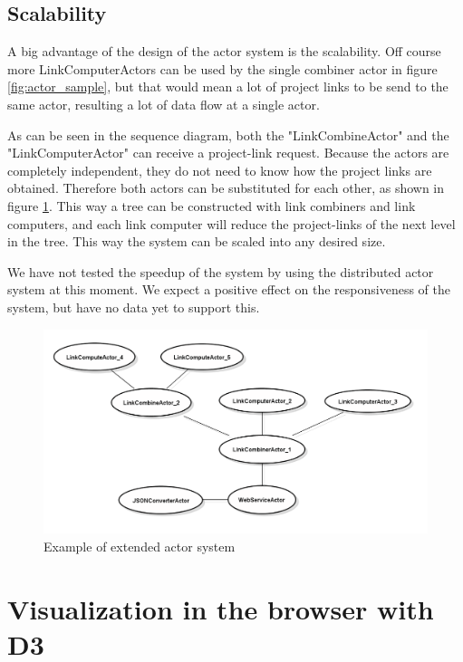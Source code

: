\documentclass[10pt,a4paper]{article}
\begin{document}

\subsection{Scalability}

A big advantage of the design of the actor system is the scalability. Off course more LinkComputerActors can be used by the single combiner actor in figure \ref{fig:actor_sample}, but that would mean a lot of project links to be send to the same actor, resulting a lot of data flow at a single actor. 

As can be seen in the sequence diagram, both the "LinkCombineActor" and the "LinkComputerActor" can receive a project-link request. Because the actors are completely independent, they do not need to know how the project links are obtained. Therefore both actors can be substituted for each other, as shown in figure \ref{fig:example_scalable}. This way a tree can be constructed with link combiners and link computers, and each link computer will reduce the project-links of the next level in the tree. This way the system can be scaled into any desired size.

We have not tested the speedup of the system by using the distributed actor system at this moment. We expect a positive effect on the responsiveness of the system, but have no data yet to support this.

\begin{figure}[htb]
    \centering
    \includegraphics[width=1.00\textwidth]{ActorSystemSampleExtended}
    \caption{Example of extended actor system}
    \label{fig:example_scalable}
\end{figure}

\section{Visualization in the browser with D3}\label{sec:visualization}
\end{document}
